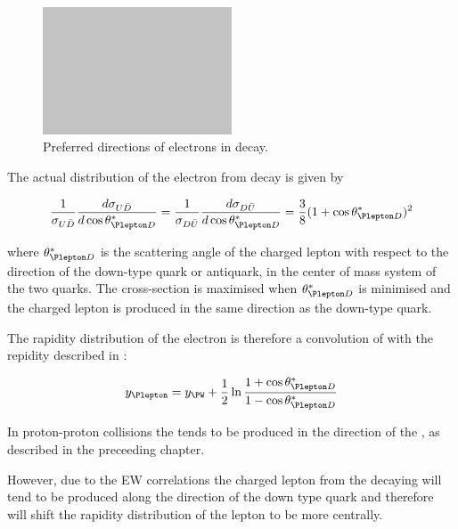 \begin{figure}[htb]
  \centering
  \includegraphics[width=0.5\textwidth]{placeholder}
  \caption{Preferred directions of electrons in \Wenu decay.}
  \label{wbos:wspin}
\end{figure}

The actual distribution of the electron from \PWpm decay is given by

\begin{equation}
  \frac{1}{\sigma_{U\bar{D}}}
  \frac{d \sigma_{U\bar{D}}}{d \cos \theta_{\Plepton D}^{\ast}}
  =
  \frac{1}{\sigma_{D\bar{U}}}
  \frac{d \sigma_{D\bar{U}}}{d \cos \theta_{\Plepton D}^{\ast}}
  =
  \frac{3}{8}(1+\cos \theta_{\Plepton D}^{\ast})^2
  \label{wbos:lepton}
\end{equation}

where $\theta_{\Plepton D}^{\ast}$ is the scattering angle of the charged
lepton with respect to the direction of the down-type quark or antiquark, in
the center of mass system of the two quarks. The cross-section is maximised when
$\theta_{\Plepton D}^{\ast}$ is minimised and the charged lepton is produced in
the same direction as the down-type quark.

The rapidity distribution of the electron is therefore a convolution of
 with the \PW repidity described in
:

\begin{equation}
  y_{\Plepton} = 
  y_{\PW} +
  \frac{1}{2}
  \ln
  \frac{1 + \cos \theta_{\Plepton D}^{\ast}}{1 - \cos \theta_{\Plepton D}^{\ast}}
  \label{wbos:leptonfull}
\end{equation}

In proton-proton collisions the \PWp tends to be produced in the direction
of the \Pup, as described in the preceeding chapter. 

However, due to the EW correlations the charged lepton from the decaying \PWp
will tend to be produced along the direction of the down type quark and
therefore will shift the rapidity distribution of the lepton to be more
centrally.

